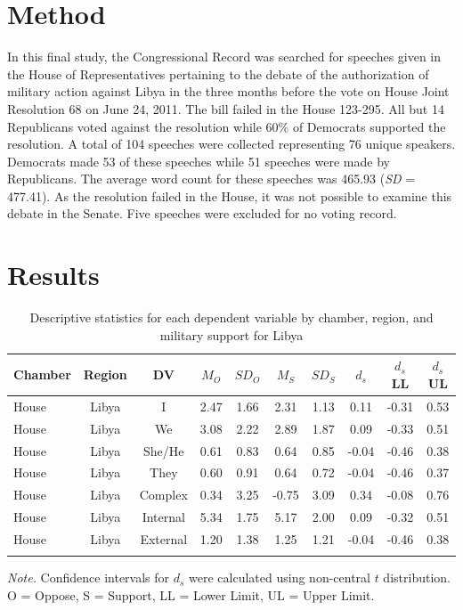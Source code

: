 \documentclass[english,,man,floatsintext]{apa6}
\begin{document}
\hypertarget{method-5}{%
\section{Method}\label{method-5}}

In this final study, the Congressional Record was searched for speeches given in the House of Representatives pertaining to the debate of the authorization of military action against Libya in the three months before the vote on House Joint Resolution 68 on June 24, 2011. The bill failed in the House 123-295. All but 14 Republicans voted against the resolution while 60\% of Democrats supported the resolution. A total of 104 speeches were collected representing 76 unique speakers. Democrats made 53 of these speeches while 51 speeches were made by Republicans. The average word count for these speeches was 465.93 (\emph{SD} = 477.41). As the resolution failed in the House, it was not possible to examine this debate in the Senate. Five speeches were excluded for no voting record.

\hypertarget{results-4}{%
\section{Results}\label{results-4}}

\begin{table}[tbp]
\begin{center}
\begin{threeparttable}
\caption{\label{tab:Ltable}Descriptive statistics for each dependent variable by chamber, 
          region, and military support for Libya}
\small{
\begin{tabular}{lccccccccc}
\toprule
Chamber & Region & DV & $M_O$ & $SD_O$ & $M_S$ & $SD_S$ & $d_s$ & $d_s$ LL & $d_s$ UL\\
\midrule
House & Libya & I & 2.47 & 1.66 & 2.31 & 1.13 & 0.11 & -0.31 & 0.53\\
House & Libya & We & 3.08 & 2.22 & 2.89 & 1.87 & 0.09 & -0.33 & 0.51\\
House & Libya & She/He & 0.61 & 0.83 & 0.64 & 0.85 & -0.04 & -0.46 & 0.38\\
House & Libya & They & 0.60 & 0.91 & 0.64 & 0.72 & -0.04 & -0.46 & 0.37\\
House & Libya & Complex & 0.34 & 3.25 & -0.75 & 3.09 & 0.34 & -0.08 & 0.76\\
House & Libya & Internal & 5.34 & 1.75 & 5.17 & 2.00 & 0.09 & -0.32 & 0.51\\
House & Libya & External & 1.20 & 1.38 & 1.25 & 1.21 & -0.04 & -0.46 & 0.38\\
\bottomrule
\addlinespace
\end{tabular}
}
\begin{tablenotes}[para]
\normalsize{\textit{Note.} Confidence intervals for $d_s$ were calculated using 
          non-central $t$ distribution. O = Oppose, S = Support, LL = Lower Limit, UL = Upper Limit.}
\end{tablenotes}
\end{threeparttable}
\end{center}
\end{table}
\end{document}
